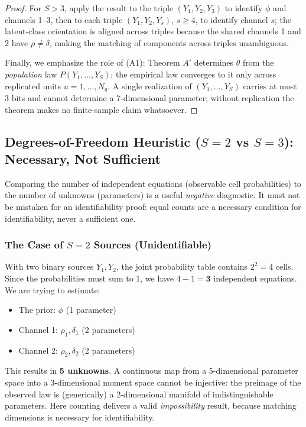 \documentclass[11pt,a4paper]{article}
\begin{document}
\begin{proof}
For $S > 3$, apply the result to the triple $(Y_1, Y_2, Y_3)$ to identify $\phi$ and channels 1--3, then to each triple $(Y_1, Y_2, Y_s)$, $s \ge 4$, to identify channel $s$; the latent-class orientation is aligned across triples because the shared channels 1 and 2 have $\rho \neq \delta$, making the matching of components across triples unambiguous. %

Finally, we emphasize the role of (A1): Theorem $A'$ determines $\theta$ from the \emph{population} law $P(Y_1, \dots, Y_S)$; the empirical law converges to it only across replicated units $u = 1, \dots, N_g$. A single realization of $(Y_1, \dots, Y_S)$ carries at most 3 bits and cannot determine a 7-dimensional parameter; without replication the theorem makes no finite-sample claim whatsoever. %
\end{proof}

\subsection{Degrees-of-Freedom Heuristic ($S=2$ vs $S=3$): Necessary, Not Sufficient}
Comparing the number of independent equations (observable cell probabilities) to the number of unknowns (parameters) is a useful \emph{negative} diagnostic. It must not be mistaken for an identifiability proof: equal counts are a necessary condition for identifiability, never a sufficient one. %

\subsubsection{The Case of $S=2$ Sources (Unidentifiable)}
With two binary sources $Y_1, Y_2$, the joint probability table contains $2^2 = 4$ cells. Since the probabilities must sum to 1, we have $4 - 1 = \textbf{3}$ independent equations.
We are trying to estimate:
\begin{itemize}
    \item The prior: $\phi$ (1 parameter)
    \item Channel 1: $\rho_1, \delta_1$ (2 parameters)
    \item Channel 2: $\rho_2, \delta_2$ (2 parameters)
\end{itemize}
This results in \textbf{5 unknowns}. A continuous map from a 5-dimensional parameter space into a 3-dimensional moment space cannot be injective: the preimage of the observed law is (generically) a 2-dimensional manifold of indistinguishable parameters. Here counting delivers a valid \emph{impossibility} result, because matching dimensions is necessary for identifiability. %
\end{document}

